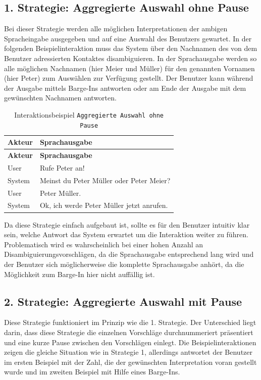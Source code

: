 \documentclass[12pt,a4paper]{scrartcl}
\begin{document}
\subsection{1. Strategie: Aggregierte Auswahl ohne Pause}
Bei dieser Strategie werden alle möglichen Interpretationen der ambigen Spracheingabe ausgegeben und auf eine Auswahl des Benutzers gewartet. In der folgenden  Beispielinteraktion muss das System über den Nachnamen des von dem Benutzer adressierten Kontaktes disambiguieren. In der Sprachausgabe werden so alle möglichen Nachnamen (hier Meier und Müller) für den genannten Vornamen (hier Peter) zum Auswählen zur Verfügung gestellt. Der Benutzer kann während der Ausgabe mittels Barge-Ins antworten oder am Ende der Ausgabe mit dem gewünschten Nachnamen antworten. 


\begin{longtable}{p{6cm}p{8cm}}
	\caption[Interaktionsbeispiel \texttt{Aggregierte Auswahl ohne Pause}]{Interaktionsbeispiel \texttt{Aggregierte Auswahl ohne Pause}}\\
	\hline
	\textbf{Akteur} &	\textbf{Sprachausgabe}\\
	\hline
	\endfirsthead
	\hline
	\textbf{Akteur} &	\textbf{Sprachausgabe}\\
	\hline
	\endhead
User & Rufe Peter an!\\
System & Meinst du Peter Müller oder Peter Meier?\\
User & Peter Müller.\\
System & Ok, ich werde Peter Müller jetzt anrufen.\\

\hline
\end{longtable}
	

Da diese Strategie einfach aufgebaut ist, sollte es für den Benutzer intuitiv klar sein, welche Antwort das System erwartet um die Interaktion weiter zu führen. Problematisch wird es wahrscheinlich bei einer hohen Anzahl an Disambiguierungsvorschlägen, da die Sprachausgabe entsprechend lang wird und der Benutzer sich möglicherweise die komplette Sprachausgabe anhört, da die Möglichkeit zum Barge-In hier nicht auffällig ist. 
  

\subsection{2. Strategie: Aggregierte Auswahl mit Pause}
Diese Strategie funktioniert im Prinzip wie die 1. Strategie. Der Unterschied liegt darin, dass diese Strategie die einzelnen Vorschläge durchnummeriert präsentiert und eine kurze Pause zwischen den Vorschlägen einlegt. Die Beispielinteraktionen zeigen die gleiche Situation wie in Strategie 1, allerdings antwortet der Benutzer im ersten Beispiel mit der Zahl, die der gewünschten Interpretation voran gestellt wurde und im zweiten Beispiel mit Hilfe eines Barge-Ins.\\
\end{document}
